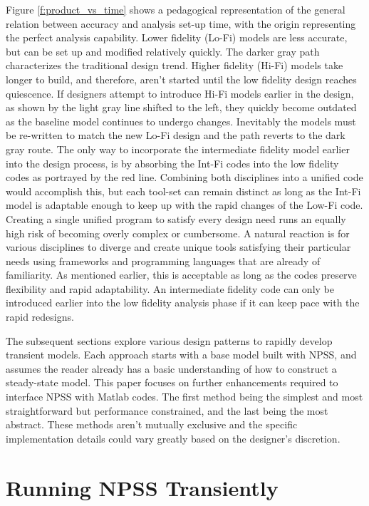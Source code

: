 \documentclass[heading.tex]{subfiles}
\begin{document}
Figure \ref{f:product_vs_time} shows a pedagogical representation of the general relation between
accuracy and analysis set-up time, with the origin representing the perfect analysis capability.
Lower fidelity (Lo-Fi) models are less accurate, but can be set
up and modified relatively quickly. The darker gray path characterizes the traditional design
trend. Higher fidelity (Hi-Fi) models take longer to build, and therefore, aren't started until
the low fidelity design reaches quiescence. If designers attempt to introduce Hi-Fi models earlier in
the design, as shown by the light gray line shifted to the left, they quickly become outdated as
the baseline model continues to undergo changes. Inevitably the models must be re-written to match
the new Lo-Fi design and the path reverts to the dark gray route. The only way to incorporate the
intermediate fidelity model earlier into the design process, is by absorbing the Int-Fi codes into
the low fidelity codes as portrayed by the red line. Combining both disciplines into a unified code
would accomplish this, but each tool-set can remain distinct as long as the Int-Fi model is
adaptable enough to keep up with the rapid changes of the Low-Fi code.
Creating a single unified program to satisfy every design need runs an equally high risk
of becoming overly complex or cumbersome. 
A natural reaction is for various
disciplines to diverge and create unique tools satisfying their particular needs using frameworks
and programming languages that are already of familiarity. As mentioned earlier, this is
acceptable as long as the codes preserve flexibility and rapid adaptability. An intermediate
fidelity code can only be introduced earlier into the low fidelity analysis phase if it can keep
pace with the rapid redesigns.

The subsequent sections explore various design patterns to rapidly develop transient models. Each
approach starts with a base model built with NPSS, and assumes the reader already has a basic
understanding of how to construct a steady-state model. This paper focuses on further enhancements
required to interface NPSS with Matlab codes. The first method being the simplest and most
straightforward but performance constrained, and the last being the most abstract. These methods
aren't mutually exclusive and the specific implementation details could vary greatly based on the
designer's discretion. 


\section{Running NPSS Transiently}
\end{document}
